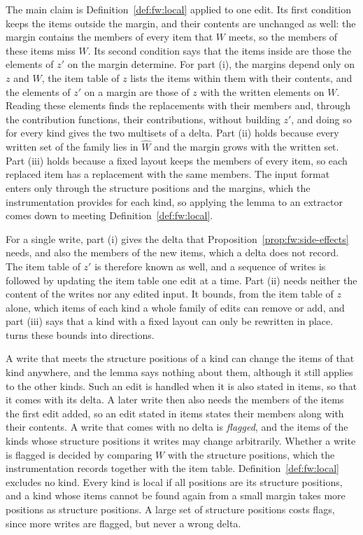 \noindent The main claim is Definition~\ref{def:fw:local} applied to one edit. Its first condition keeps the items
outside the margin, and their contents are unchanged as well: the margin contains the members of every item that $W$
meets, so the members of these items miss $W$. Its second condition says that the items inside are those the elements of
$z'$ on the margin determine. For part (i), the margins depend only on $z$ and $W$, the item table of $z$ lists the
items within them with their contents, and the elements of $z'$ on a margin are those of $z$ with the written elements
on $W$. Reading these elements finds the replacements with their members and, through the contribution functions, their
contributions, without building $z'$, and doing so for every kind gives the two multisets of a delta. Part (ii) holds
because every written set of the family lies in $\hat{W}$ and the margin grows with the written set. Part (iii) holds
because a fixed layout keeps the members of every item, so each replaced item has a replacement with the same members.
The input format enters only through the structure positions and the margins, which the instrumentation provides for
each kind, so applying the lemma to an extractor comes down to meeting Definition~\ref{def:fw:local}.

For a single write, part (i) gives the delta that Proposition~\ref{prop:fw:side-effects} needs, and also the members of
the new items, which a delta does not record. The item table of $z'$ is therefore known as well, and a sequence of
writes is followed by updating the item table one edit at a time. Part (ii) needs neither the content of the writes nor
any edited input. It bounds, from the item table of $z$ alone, which items of each kind a whole family of edits can
remove or add, and part (iii) says that a kind with a fixed layout can only be rewritten in place.
 turns these bounds into directions.

A write that meets the structure positions of a kind can change the items of that kind anywhere, and the lemma says
nothing about them, although it still applies to the other kinds. Such an edit is handled when it is also stated in
items, so that it comes with its delta. A later write then also needs the members of the items the first edit added, so
an edit stated in items states their members along with their contents. A write that comes with no delta is
\emph{flagged}, and the items of the kinds whose structure positions it writes may change arbitrarily. Whether a write
is flagged is decided by comparing $W$ with the structure positions, which the instrumentation records together with the
item table. Definition~\ref{def:fw:local} excludes no kind. Every kind is local if all positions are its structure
positions, and a kind whose items cannot be found again from a small margin takes more positions as structure positions.
A large set of structure positions costs flags, since more writes are flagged, but never a wrong delta.


